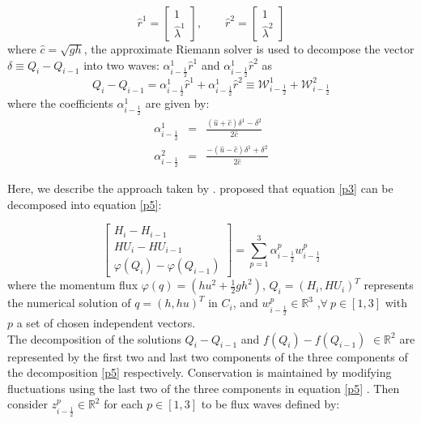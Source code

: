 \documentclass[11pt,a4paper]{article}
\begin{document}
	\begin{equation}
		\hat{r}^1 =  \begin{bmatrix} 1 \\ 	\hat{\lambda}^1 \end{bmatrix}, \qquad 	\hat{r}^2 =  
		\begin{bmatrix} 1 \\ 	\hat{\lambda}^2 \end{bmatrix}
		\label{vec}
	\end{equation}
	where $\hat{c} = \sqrt{gh}$, the approximate Riemann solver is used to decompose the vector  $ \delta \equiv Q_{i} - Q_{i-1}$ into two waves: $\alpha_{i-\frac{1}{2}}^{1} \hat{r}^1$ and $\alpha_{i-\frac{1}{2}}^{1} \hat{r}^2$ as 
	\begin{equation}
		Q_{i} - Q_{i-1} = \alpha_{i-\frac{1}{2}}^{1} \hat{r}^1 + \alpha_{i-\frac{1}{2}}^{1} \hat{r}^2 \equiv \mathcal{W}_{i-\frac{1}{2}}^{1} + \mathcal{W}_{i-\frac{1}{2}}^{2}
	\end{equation}
	where the coefficients $\alpha_{i-\frac{1}{2}}^{1}$ are given by:
	\begin{eqnarray}
		\alpha_{i-\frac{1}{2}}^{1} &=& \frac{(\hat{u} + \hat{c})\delta^{1} - \delta^2}{2\hat{c}}\\
		\alpha_{i-\frac{1}{2}}^{2} &=& \frac{-(\hat{u} - \hat{c})\delta^{1} + \delta^2}{2\hat{c}}
	\end{eqnarray}

	Here, we describe the approach taken by \citet{ge:2008}.  \citet{leveque2001class} proposed that equation \eqref{p3} can be decomposed into equation \eqref{p5}:

	\begin{equation}
		\begin{bmatrix} 
			H_{i} - H_{i-1}\\ 	HU_{i} - HU_{i-1} \\  \varphi(Q_{i}) - \varphi(Q_{i-1}) 
		\end{bmatrix} = \sum_{p=1}^{3} \alpha_{i-\frac{1}{2}}^{p} w_{i-\frac{1}{2}}^{p}
		\label{p5}
	\end{equation}
	where the momentum flux $\varphi(q) = (hu^{2} + \frac{1}{2} gh^{2})$, $Q_{i} = (H_{i},HU_{i})^{T}$ represents the numerical solution of $q = (h,hu)^{T}$ in $C_{i}$, and $w_{i-\frac{1}{2}}^{p} \in \mathbb{R}^{3}$ ,$\forall ~ p \in [1,3] $ with $p$ a set of chosen independent vectors. \\
	
	The decomposition of the solutions $Q_{i} - Q_{i-1} $  and  $f(Q_{i}) - f(Q_{i-1})$ $ \in  \mathbb{R}^{2}$ are represented by the first two and last two components of the three components of the decomposition \eqref{p5} respectively.  Conservation is maintained by modifying fluctuations using the last two of the three components  in equation \eqref{p5} \cite{ba-le-mi-ro:2003}. Then  consider $z_{i-\frac{1}{2}}^{p} \in \mathbb{R}^{2}$ for each $p \in [1,3]$ to be flux waves defined by:
	
\end{document}
